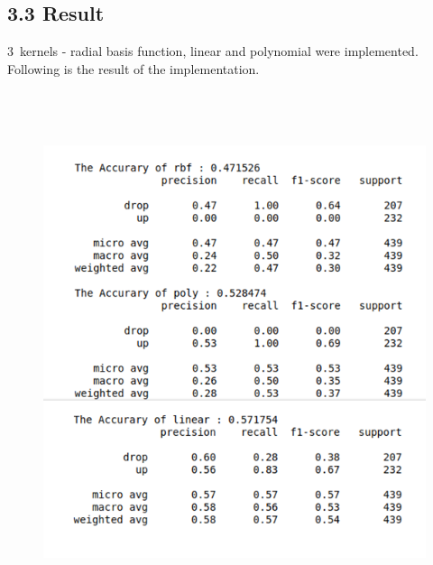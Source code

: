 \documentclass[12pt]{article}
\begin{document}
\vspace{\baselineskip}

\vspace{\baselineskip}
\subsection*{3.3 Result}

\vspace{\baselineskip}
3\ kernels - radial basis function, linear and polynomial were implemented.  Following is the result of the implementation.\par


\vspace{\baselineskip}



\begin{figure}[H]
	\begin{Center}
		\includegraphics[width=5.59in,height=6.02in]{./media/image3.png}
	\end{Center}
\end{figure}
\end{document}
